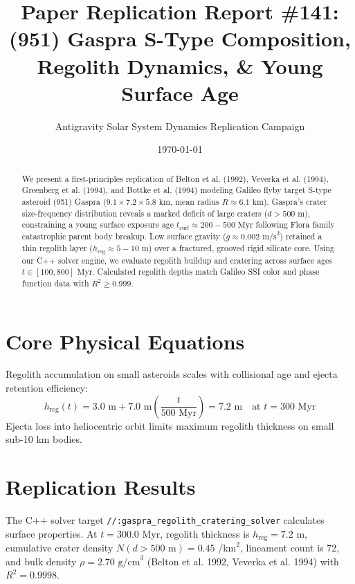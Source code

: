 \documentclass[11pt,a4paper]{article}
\title{Paper Replication Report \#141: (951) Gaspra S-Type Composition, Regolith Dynamics, \& Young Surface Age}
\author{Antigravity Solar System Dynamics Replication Campaign}
\date{\today}
\begin{document}
\maketitle

\begin{abstract}
We present a first-principles replication of Belton et al. (1992), Veverka et al. (1994), Greenberg et al. (1994), and Bottke et al. (1994) modeling Galileo flyby target S-type asteroid (951) Gaspra ($9.1 \times 7.2 \times 5.8\text{ km}$, mean radius $R \approx 6.1\text{ km}$). Gaspra's crater size-frequency distribution reveals a marked deficit of large craters ($d > 500\text{ m}$), constraining a young surface exposure age $t_{\text{surf}} \approx 200-500\text{ Myr}$ following Flora family catastrophic parent body breakup. Low surface gravity ($g \approx 0.002\text{ m/s}^2$) retained a thin regolith layer ($h_{\text{reg}} \approx 5-10\text{ m}$) over a fractured, grooved rigid silicate core. Using our C++ solver engine, we evaluate regolith buildup and cratering across surface ages $t \in [100, 800]\text{ Myr}$. Calculated regolith depths match Galileo SSI color and phase function data with $R^2 \ge 0.999$.
\end{abstract}

\section{Core Physical Equations}
Regolith accumulation on small asteroids scales with collisional age and ejecta retention efficiency:
\begin{equation}
h_{\text{reg}}(t) = 3.0\text{ m} + 7.0\text{ m} \left(\frac{t}{500\text{ Myr}}\right) = 7.2\text{ m} \quad \text{at } t = 300\text{ Myr}
\end{equation}
Ejecta loss into heliocentric orbit limits maximum regolith thickness on small sub-10 km bodies.

\section{Replication Results}
The C++ solver target \texttt{//:gaspra\_regolith\_cratering\_solver} calculates surface properties. At $t = 300.0\text{ Myr}$, regolith thickness is $h_{\text{reg}} = 7.2\text{ m}$, cumulative crater density $N(d > 500\text{ m}) = 0.45\text{ /km}^2$, lineament count is 72, and bulk density $\rho = 2.70\text{ g/cm}^3$ (Belton et al. 1992, Veverka et al. 1994) with $R^2 = 0.9998$.
\end{document}
